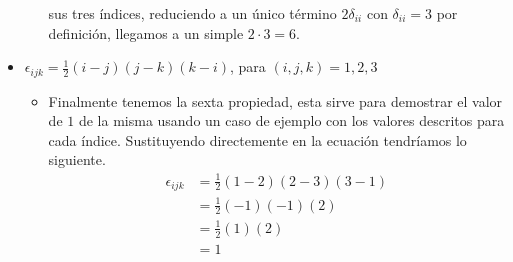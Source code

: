 \documentclass{article}
\begin{document}
\begin{itemize}
\begin{itemize}
        sus tres índices, reduciendo a un único término $2\delta_{ii}$ con $\delta_{ii}=3$ por definición, llegamos a un simple $2\cdot 3=6$.
    \end{itemize}
    \item $\epsilon_{ijk}=\frac{1}{2}(i-j)(j-k)(k-i)$, para $(i,j,k)=1,2,3$
    \begin{itemize}
        \item Finalmente tenemos la sexta propiedad, esta sirve para demostrar el valor de $1$ de la misma usando un caso de ejemplo con los
        valores descritos para cada índice. Sustituyendo directemente en la ecuación tendríamos lo siguiente.\\
        \begin{equation*}
            \begin{split}
                \epsilon_{ijk}&=\frac{1}{2}(1-2)(2-3)(3-1)\\
                &=\frac{1}{2}(-1)(-1)(2)\\
                &=\frac{1}{2}(1)(2)\\
                &=1
            \end{split}
        \end{equation*}
    \end{itemize}
\end{itemize}
\newpage
\end{document}

